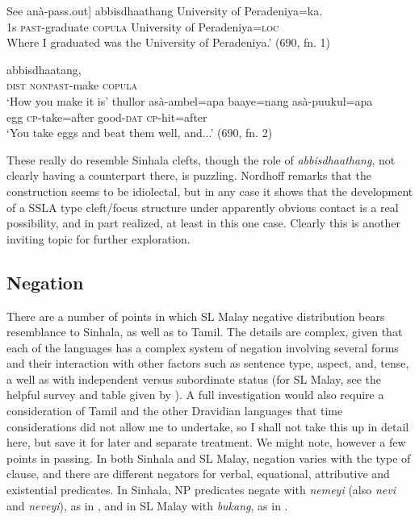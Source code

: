 \ea\label{ex3.7.15} 
\gll See anà-pass.out] abbisdhaathang University of Peradeniya=ka.\\
1s \textsc{past}-graduate \textsc{copula} University of Peradeniya=\textsc{loc}\\
Where I graduated was the University of Peradeniya.' (690, fn. 1)
\z




\ea\label{ex3.7.16} 
\ea
{}  abbisdhaatang,\\
  \textsc{dist} \textsc{nonpast}-make \textsc{copula}\\
  `How you make it is'
\ex
\gll thullor asà-ambel=apa baaye=nang asà-puukul=apa\\
   egg \textsc{cp}-take=after  good-\textsc{dat}  \textsc{cp}-hit=after\\
   `You take eggs and beat them well, and...'  (690, fn. 2)
\z
\z


These really do resemble Sinhala clefts, though the role of \textit{abbisdhaathang}, not clearly having a counterpart there, is puzzling.  Nordhoff remarks that the construction seems to be idiolectal, but in any case it shows that the development of a SSLA type cleft/focus structure under apparently obvious contact is a real possibility, and in part realized, at least in this one case.
 Clearly this is another inviting topic for further exploration.

\subsection{Negation} \label{gair:sec:3.10}
 There are a number of points in which SL Malay negative distribution bears resemblance to Sinhala, as well as to Tamil. The details are complex, given that each of the languages has a complex system of negation involving several forms and their interaction with other factors such as sentence type, aspect, and, tense, a well as with independent versus subordinate status (for SL Malay, see the helpful survey and table given by \citet{Nordhoffgrammartv}). A full investigation would also require a consideration of Tamil and the other Dravidian languages that time considerations did not allow me to undertake, so I shall not take this up in detail here, but save it for later and separate treatment. We might note, however a few points in passing. 
 In both Sinhala and SL Malay, negation varies with the type of clause, and there are different negators for verbal, equational, attributive and existential predicates. In Sinhala, NP predicates negate with \textit{nemeyi} (also \textit{nevi} and \textit{neveyi}), as in , and in SL Malay with \textit{bukang}, as in .


